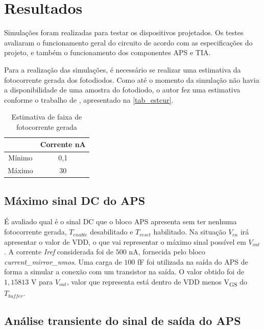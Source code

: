 \chapter{Resultados}

Simulações foram realizadas para testar os dispositivos projetados. Os testes avaliaram o funcionamento geral do circuito de acordo com as especificações do projeto, e também o funcionamento dos componentes APS e TIA.

Para a realização das simulações, é necessário se realizar uma estimativa da fotocorrente gerada dos fotodiodos. Como até o momento da simulação não havia a disponibilidade de uma amostra do fotodiodo, o autor fez uma estimativa conforme o trabalho de \cite{LidianeCampos}, apresentado na \autoref{tab_estcur}.

\begin{table}[!h]
\caption{Estimativa de faixa de fotocorrente gerada}
\label{tab_estcur}
\centering
\begin{tabular}{cc}
\toprule
& Corrente nA \\
\midrule \midrule
Mínimo & 0,1\\
\midrule
Máximo & 30\\
\bottomrule
\end{tabular}
\end{table}

\section{Máximo sinal DC do APS}
\label{DCAPS}

É avaliado qual é o sinal DC que o bloco APS apresenta sem ter nenhuma fotocorrente gerada, $T_{enable}$ desabilitado e $T_{reset}$ habilitado. Na situação $V_{cn}$ irá apresentar o valor de VDD, o que vai representar o máximo sinal possível em $V_{out}$. A corrente \textit{Iref} considerada foi de $500$ nA, fornecida pelo bloco \textit{current\_mirror\_nmos}. Uma carga de $100$ fF foi utilizada na saída do APS de forma a simular a conexão com  um transistor na saída. O valor obtido foi de $1,15813$ V para $V_{out}$, valor que representa está dentro de VDD menos V\textsubscript{GS} do $T_{buffer}$.

\section{Análise transiente do sinal de saída do APS}

